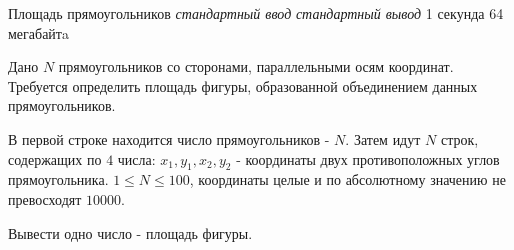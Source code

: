 \begin{problem}%
{Площадь прямоугольников}%
{\textsl{стандартный ввод}}%
{\textsl{стандартный вывод}}%
{1 секунда}%
{64 мегабайтa}{}

Дано $N$ прямоугольников со сторонами, параллельными осям координат. Требуется определить площадь фигуры, образованной объединением данных прямоугольников.

\InputFile

В первой строке находится число прямоугольников - $N$. Затем идут $N$ строк, содержащих по $4$ числа: $x_1, y_1, x_2, y_2$ - координаты двух противоположных углов прямоугольника. $1 \le N \le 100$, координаты целые и по абсолютному значению не превосходят $10000$.

\OutputFile

Вывести одно число - площадь фигуры.

\Examples

\begin{example}
%
%
\end{example}
\end{problem}
